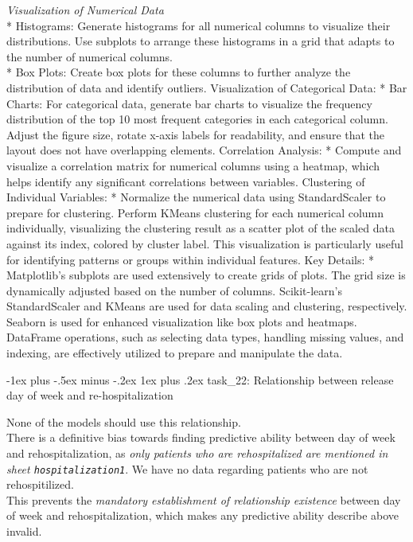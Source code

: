 \documentclass[a4paper,landscape]{article}
\makeatletter
\renewcommand{\subsubsection}{\@startsection{subsubsection}{3}{0mm}%
                                {-1ex plus -.5ex minus -.2ex}%
                                {1ex plus .2ex}%
                                {\normalfont\small\bfseries}}
\makeatother
\begin{document}
\emph{Visualization of Numerical Data}\\
* Histograms: Generate histograms for all numerical columns to visualize
their distributions. Use subplots to arrange these histograms in a grid
that adapts to the number of numerical columns.\\
* Box Plots: Create box plots for these columns to further analyze the
distribution of data and identify outliers. Visualization of Categorical
Data: * Bar Charts: For categorical data, generate bar charts to
visualize the frequency distribution of the top 10 most frequent
categories in each categorical column. Adjust the figure size, rotate
x-axis labels for readability, and ensure that the layout does not have
overlapping elements. Correlation Analysis: * Compute and visualize a
correlation matrix for numerical columns using a heatmap, which helps
identify any significant correlations between variables. Clustering of
Individual Variables: * Normalize the numerical data using
StandardScaler to prepare for clustering. Perform KMeans clustering for
each numerical column individually, visualizing the clustering result as
a scatter plot of the scaled data against its index, colored by cluster
label. This visualization is particularly useful for identifying
patterns or groups within individual features. Key Details: *
Matplotlib's subplots are used extensively to create grids of plots. The
grid size is dynamically adjusted based on the number of columns.
Scikit-learn's StandardScaler and KMeans are used for data scaling and
clustering, respectively. Seaborn is used for enhanced visualization
like box plots and heatmaps. DataFrame operations, such as selecting
data types, handling missing values, and indexing, are effectively
utilized to prepare and manipulate the data.

\subsubsection{task\_22: Relationship between release day of week and
re-hospitalization}\label{task_22-relationship-between-release-day-of-week-and-re-hospitalization}

None of the models should use this relationship.\\
There is a definitive bias towards finding predictive ability between
day of week and rehospitalization, as \emph{only patients who are
rehospitalized are mentioned in sheet \texttt{hospitalization1}}. We
have no data regarding patients who are not rehospitilized.\\
This prevents the \emph{mandatory establishment of relationship
existence} between day of week and rehospitalization, which makes any
predictive ability describe above invalid.
\end{document}
